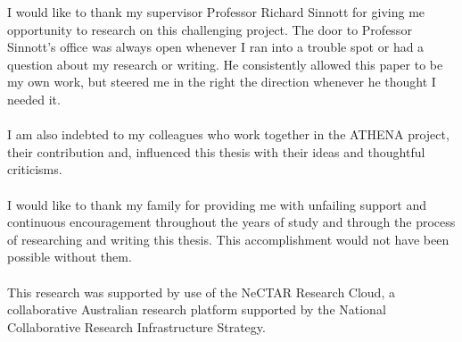 \documentclass[
11pt, %
oneside, %
english, %
singlespacing, %
headsepline, %
chapterinoneline, %
consistentlayout, %
]{MastersDoctoralThesis} %
\begin{document}
\begin{acknowledgements}
\addchaptertocentry{\acknowledgementname} %
\bigskip\noindent\ignorespaces

I would like to thank my supervisor Professor Richard Sinnott for giving me opportunity to research on this challenging project. The door to Professor Sinnott's office was always open whenever I ran into a trouble spot or had a question about my research or writing. He consistently allowed this paper to be my own work, but steered me in the right the direction whenever he thought I needed it.
\\
\\
I am also indebted to my colleagues who work together in the ATHENA project, their contribution and, influenced this thesis with their ideas and thoughtful criticisms.
\\
\\
I would like to thank my family for providing me with unfailing support and continuous encouragement throughout the years of study and through the process of researching and writing this thesis. This accomplishment would not have been possible without them.
\\
\\
This research was supported by use of the NeCTAR Research Cloud, a collaborative Australian research platform supported by the National Collaborative Research Infrastructure Strategy.


\end{acknowledgements}


\tableofcontents %





\end{document}
